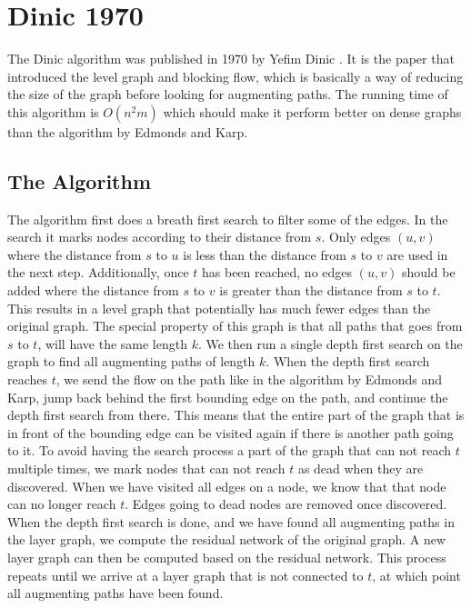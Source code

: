 \section{Dinic 1970}
\label{DinicSection}

The Dinic algorithm was published in 1970 by Yefim Dinic \cite{dinic1970}. It is the paper that introduced the level graph and blocking flow, 
which is basically a way of reducing the size of the graph before looking for augmenting paths.
The running time of this algorithm is $O(n^2m)$ which should make it perform better on dense graphs than the algorithm by Edmonds and Karp.

\subsection{The Algorithm}

The algorithm first does a breath first search to filter some of the edges. In the search it marks nodes according to their distance from $s$.
Only edges $(u, v)$ where the distance from $s$ to $u$ is less than the distance from $s$ to $v$ are used in the next step. 
Additionally, once $t$ has been reached, no edges $(u, v)$ should be added where the distance from $s$ to $v$ is greater than the distance from $s$ to $t$.
This results in a level graph that potentially has much fewer edges than the original graph.
The special property of this graph is that all paths that goes from $s$ to $t$, will have the same length $k$.
We then run a single depth first search on the graph to find all augmenting paths of length $k$. 
When the depth first search reaches $t$, we send the flow on the path like in the algorithm by Edmonds and Karp, 
jump back behind the first bounding edge on the path, and continue the depth first search from there.
This means that the entire part of the graph that is in front of the bounding edge can be visited again if there is another path going to it.
To avoid having the search process a part of the graph that can not reach $t$ multiple times, we mark nodes that can not reach $t$ as dead when they are discovered.
When we have visited all edges on a node, we know that that node can no longer reach $t$. Edges going to dead nodes are removed once discovered.
When the depth first search is done, and we have found all augmenting paths in the layer graph, we compute the residual network of the original graph.
A new layer graph can then be computed based on the residual network.
This process repeats until we arrive at a layer graph that is not connected to $t$, at which point all augmenting paths have been found.

